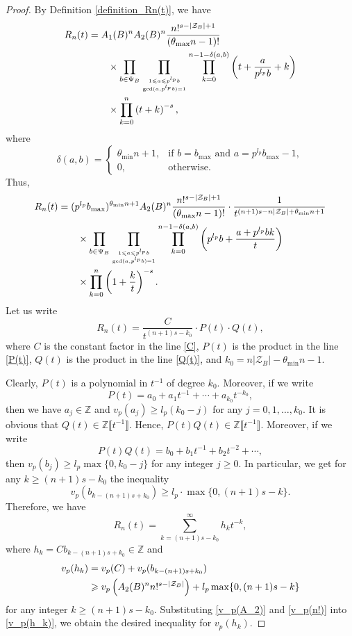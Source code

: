 \documentclass[12pt]{article}
\numberwithin{equation}{section}
\begin{document}
\begin{proof}
By Definition \ref{definition_Rn(t)}, we have
\begin{align*}
	R_n(t) &= A_1(B)^n A_2(B)^n \frac{n!^{s-|\mathcal{Z}_B|+1}}{(\theta_{\max}n-1)!} \\
	&\qquad\times \prod_{b \in \Psi_B} \prod_{1 \leqslant a \leqslant p^{l_p}b \atop \gcd(a,p^{l_p}b)=1}\prod_{k=0}^{n-1-\delta(a,b)} \left( t+\frac{a}{p^{l_p}b} + k \right) \\
	&\qquad\times \prod_{k=0}^{n} \left( t + k \right)^{-s},
\end{align*}
where
\[ \delta(a,b) = \begin{cases} \theta_{\min}n+1, &\text{if~} b = b_{\max} \text{~and~} a=p^{l_p}b_{\max} - 1, \\  0, &\text{otherwise.}  \end{cases} \]
Thus,
\begin{align}
R_n(t) &= (p^{l_p}b_{\max})^{\theta_{\min}n+1} A_2(B)^n \frac{n!^{s-|\mathcal{Z}_B|+1}}{(\theta_{\max}n-1)!} \cdot \frac{1}{t^{(n+1)s-n|\mathcal{Z}_B|+\theta_{\min}n+1}} \label{C}\\
&\qquad\times \prod_{b \in \Psi_B} \prod_{1 \leqslant a \leqslant p^{l_p}b \atop \gcd(a,p^{l_p}b)=1}\prod_{k=0}^{n-1-\delta(a,b)} \left( p^{l_p}b+ \frac{a + p^{l_p}bk}{t} \right) \label{P(t)}\\
&\qquad\times \prod_{k=0}^{n} \left( 1 + \frac{k}{t} \right)^{-s}. \label{Q(t)}
\end{align}
Let us write
\[ R_n(t) = \frac{C}{t^{(n+1)s-k_0}} \cdot P(t) \cdot Q(t), \]
where $C$ is the constant factor in the line \eqref{C}, $P(t)$ is the product in the line \eqref{P(t)}, $Q(t)$ is the product in the line \eqref{Q(t)}, and $k_0 = n|\mathcal{Z}_B|-\theta_{\min}n-1$. 

Clearly, $P(t)$ is a polynomial in $t^{-1}$ of degree $k_0$. Moreover, if we write
\[ P(t) = a_0 + a_1 t^{-1} + \cdots + a_{k_{0}}t^{-k_0}, \]
then we have $a_j \in \mathbb{Z}$ and $v_p(a_j) \geqslant l_p(k_0-j)$ for any $j=0,1,\ldots,k_0$. It is obvious that $Q(t) \in \mathbb{Z}\llbracket t^{-1} \rrbracket$. Hence, $P(t)Q(t) \in \mathbb{Z}\llbracket t^{-1} \rrbracket$. Moreover, if we write 
\[ P(t)Q(t) = b_0 + b_1 t^{-1} + b_2t^{-2} + \cdots, \]
then $v_p(b_j) \geqslant l_p\max\{ 0, k_0 - j\}$ for any integer $j \geqslant 0$. In particular, we get for any $k\geqslant (n+1)s-k_0$ the inequality
\[
    v_p(b_{k-(n+1)s+k_0})\geqslant l_p \cdot \max\{ 0, (n+1)s-k \}.
\]
Therefore, we have 
\begin{equation}\label{h_k_power_series}
R_n(t) = \sum_{k=(n+1)s-k_0}^{\infty} h_k t^{-k}, 
\end{equation}
where $h_k = C b_{k-(n+1)s+k_0} \in \mathbb{Z}$ and
\begin{align}
	v_p(h_k) &= v_p(C) + v_p(b_{k-(n+1)s+k_0}) \notag\\
	&\geqslant v_p\left( A_2(B)^n n!^{s-|\mathcal{Z}_B|} \right) + l_p\max\{ 0, (n+1)s-k\} \label{v_p(h_k)}
\end{align}
for any integer $k \geqslant (n+1)s-k_0$. Substituting \eqref{v_p(A_2)} and \eqref{v_p(n!)} into \eqref{v_p(h_k)}, we obtain the desired inequality for $v_p(h_k)$.


\end{proof}
\end{document}
